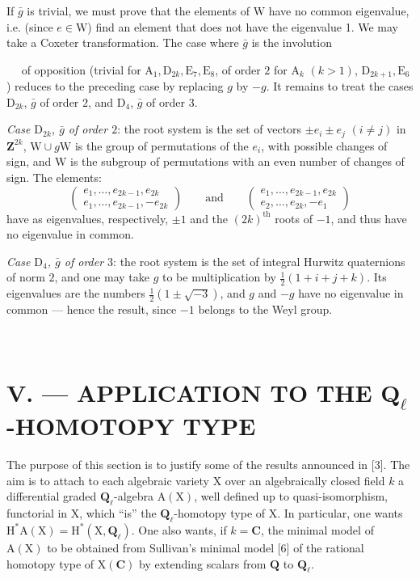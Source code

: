 \documentclass[11pt,leqno]{article}
\newcommand{\Page}[1]{\ifvmode\noindent\else\unskip\ \fi{\footnotesize\textcolor{gray}{[p.\,#1]}}\ \ignorespaces}
\begin{document}
If \(\bar{g}\) is trivial, we must prove that the elements of \(\mathrm{W}\) have no common eigenvalue, i.e. (since \(e\in\mathrm{W}\)) find an element that does not have the eigenvalue 1. We may take a Coxeter transformation. The case where \(\bar{g}\) is the involution

\Page{233}
of opposition (trivial for \(\mathrm{A}_1,\mathrm{D}_{2k},\mathrm{E}_7,\mathrm{E}_8\), of order \(2\) for \(\mathrm{A}_k\) \((k>1)\), \(\mathrm{D}_{2k+1},\mathrm{E}_6\)) reduces to the preceding case by replacing \(g\) by \(-g\). It remains to treat the cases \(\mathrm{D}_{2k}\), \(\bar g\) of order \(2\), and \(\mathrm{D}_4\), \(\bar g\) of order \(3\).

\textit{Case \(\mathrm{D}_{2k}\), \(\bar g\) of order \(2\)}: the root system is the set of vectors \(\pm e_i\pm e_j\) \((i\ne j)\) in \(\mathbf{Z}^{2k}\), \(\mathrm{W}\cup g\mathrm{W}\) is the group of permutations of the \(e_i\), with possible changes of sign, and \(\mathrm{W}\) is the subgroup of permutations with an even number of changes of sign. The elements:
\[
\left(
\begin{array}{l}
e_1,\ldots,e_{2k-1},e_{2k}\\
e_1,\ldots,e_{2k-1},-e_{2k}
\end{array}
\right)
\qquad\text{and}\qquad
\left(
\begin{array}{l}
e_1,\ldots,e_{2k-1},e_{2k}\\
e_2,\ldots,e_{2k},-e_1
\end{array}
\right)
\]
have as eigenvalues, respectively, \(\pm1\) and the \((2k)^{\text{th}}\) roots of \(-1\), and thus have no eigenvalue in common.

\textit{Case \(\mathrm{D}_4\), \(\bar g\) of order \(3\)}: the root system is the set of integral Hurwitz quaternions of norm \(2\), and one may take \(g\) to be multiplication by \(\frac{1}{2}(1+i+j+k)\). Its eigenvalues are the numbers \(\frac{1}{2}(1\pm\sqrt{-3})\), and \(g\) and \(-g\) have no eigenvalue in common — hence the result, since \(-1\) belongs to the Weyl group.

\Page{234}
\section*{\normalfont V. — APPLICATION TO THE \(\mathbf{Q}_{\ell}\)-HOMOTOPY TYPE}

The purpose of this section is to justify some of the results announced in [3]. The aim is to attach to each algebraic variety \(\mathrm{X}\) over an algebraically closed field \(k\) a differential graded \(\mathbf{Q}_{\ell}\)-algebra \(\mathrm{A}(\mathrm{X})\), well defined up to quasi-isomorphism, functorial in \(\mathrm{X}\), which “is” the \(\mathbf{Q}_{\ell}\)-homotopy type of \(\mathrm{X}\). In particular, one wants \(\mathrm{H}^*\mathrm{A}(\mathrm{X})=\mathrm{H}^*(\mathrm{X},\mathbf{Q}_{\ell})\). One also wants, if \(k=\mathbf{C}\), the minimal model of \(\mathrm{A}(\mathrm{X})\) to be obtained from Sullivan's minimal model [6] of the rational homotopy type of \(\mathrm{X}(\mathbf{C})\) by extending scalars from \(\mathbf{Q}\) to \(\mathbf{Q}_{\ell}\).
\end{document}
